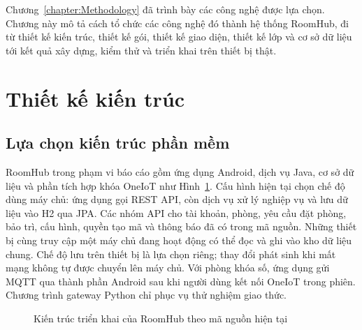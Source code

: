 \documentclass[../DoAn.tex]{subfiles}
\begin{document}
Chương~\ref{chapter:Methodology} đã trình bày các công nghệ được lựa chọn. Chương này mô tả cách tổ chức các công nghệ đó thành hệ thống RoomHub, đi từ thiết kế kiến trúc, thiết kế gói, thiết kế giao diện, thiết kế lớp và cơ sở dữ liệu tới kết quả xây dựng, kiểm thử và triển khai trên thiết bị thật.

\section{Thiết kế kiến trúc}
\subsection{Lựa chọn kiến trúc phần mềm}
RoomHub trong phạm vi báo cáo gồm ứng dụng Android, dịch vụ Java, cơ sở dữ liệu và phần tích hợp khóa OneIoT như Hình~\ref{fig:kientruc}. Cấu hình hiện tại chọn chế độ dùng máy chủ: ứng dụng gọi REST API, còn dịch vụ xử lý nghiệp vụ và lưu dữ liệu vào H2 qua JPA. Các nhóm API cho tài khoản, phòng, yêu cầu đặt phòng, bảo trì, cấu hình, quyền tạo mã và thông báo đã có trong mã nguồn. Những thiết bị cùng truy cập một máy chủ đang hoạt động có thể đọc và ghi vào kho dữ liệu chung. Chế độ lưu trên thiết bị là lựa chọn riêng; thay đổi phát sinh khi mất mạng không tự được chuyển lên máy chủ. Với phòng khóa số, ứng dụng gửi MQTT qua thành phần Android sau khi người dùng kết nối OneIoT trong phiên. Chương trình gateway Python chỉ phục vụ thử nghiệm giao thức.

\begin{figure}[H]
\centering
{}
\caption{Kiến trúc triển khai của RoomHub theo mã nguồn hiện tại}
\label{fig:kientruc}
\end{figure}
\end{document}
